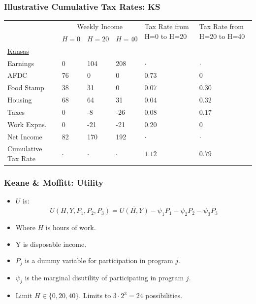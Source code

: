 \documentclass{beamer}
\begin{document}
\begin{frame}
\frametitle[alignment=center]{Illustrative Cumulative Tax Rates: KS}
\begin{table}
\centering
\begin{tabular}{p{2cm}p{1.3cm}p{1.3cm}p{1.3cm}p{1.5cm}p{1.5cm}}
 &  \multicolumn{3}{c}{Weekly Income} & \multirow{3}{*}{\parbox{1.5cm}{Tax Rate from H=0 to H=20}} & \multirow{3}{*}{\parbox{1.5cm}{Tax Rate from H=20 to H=40}} \\
 \cline{2-4}
  &  \multirow{3}{*}{$H=0$} & \multirow{3}{*}{$H=20$} & \multirow{3}{*}{$H=40$} & &  \\
  & & & & \\
    & & & & \\
\hline
\underline{Kansas} &  &  &  &  &  \\
Earnings & 0 & 104 & 208 & $\cdot$ & $\cdot$\\ 
AFDC & 76 & 0 & 0 & $0.73$ & $0$\\ 
Food Stamp & 38 & 31 & 0 & $0.07$ & $0.30$\\ 
Housing  & 68 & 64 & 31 & $0.04$ & $0.32$\\ 
Taxes & 0 & -8 & -26 & $0.08$ & $0.17$\\ 
Work Expns. & 0 & -21 & -21 & $0.20$ & $0$\\ 
Net Income & 82 & 170 & 192 & $\cdot$ & $\cdot$\\ 
\multirow{2}{*}{\parbox{2cm}{Cumulative Tax Rate}} & \multirow{2}{*}{$\cdot$} & \multirow{2}{*}{$\cdot$} & \multirow{2}{*}{$\cdot$} & \multirow{2}{*}{$1.12$} & \multirow{2}{*}{$0.79$}\\
\end{tabular}
\end{table}
\end{frame}

\begin{frame}
\frametitle[alignment=center]{Keane \& Moffitt: Utility}
\begin{itemize}
\item $U$ is:
$$U(H,Y,P_1,P_2,P_3)=\overline{U(H,Y)}-\psi_1P_1-\psi_2P_2-\psi_3P_3$$
\item Where $H$ is hours of work.
\bigskip
\item Y is disposable income.
\bigskip
\item $P_j$ is a dummy variable for participation in program $j$.
\bigskip
\item $\psi_j$ is the marginal disutility of participating in program $j$.
\bigskip
\item Limit $H\in\{0,20,40\}$.  Limits to $3\cdot2^3=24$ possibilities.
\end{itemize}
\end{frame}
\end{document}
